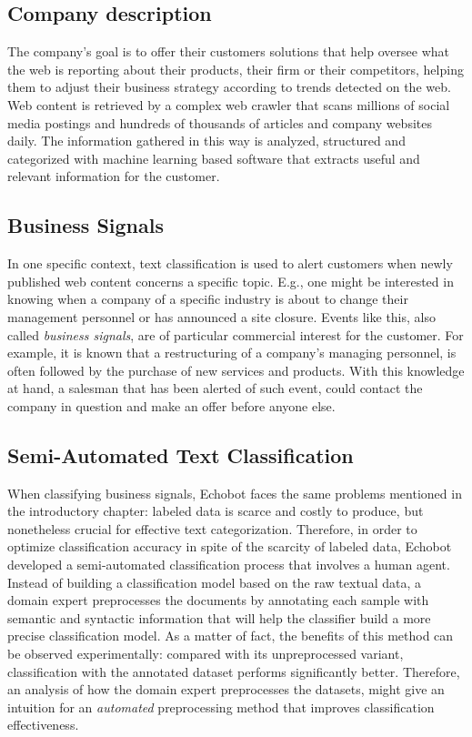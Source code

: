 \subsection{Company description}
The company's goal is to offer their customers solutions that
help oversee what the web is reporting about their products, their firm or
their competitors, helping them to adjust their business strategy according
to trends detected on the web. Web content is retrieved by a complex web crawler
that scans millions of social media postings and hundreds of thousands
of articles and company websites daily. The information gathered in this way is
analyzed, structured and categorized with machine learning based software that
extracts useful and relevant information for the customer.

\subsection{Business Signals}

In one specific context, text classification is used to alert customers when
newly published web content concerns a specific topic. E.g., one might
be interested in knowing when a company of a specific industry is about to change
their management personnel or has announced a site closure.
Events like this, also called \textit{business signals}, are of particular
commercial interest for the customer. For example, it is known that a
restructuring of a company's managing personnel, is often followed by the purchase of new
services and products. With this knowledge at hand, a salesman that has been
alerted of such event, could contact the company in question and make an offer
before anyone else.

\subsection{Semi-Automated Text Classification}

When classifying business signals, Echobot faces the same problems
mentioned in the introductory chapter: labeled data is scarce and costly to produce,
but nonetheless crucial for effective text categorization. Therefore, in order
to optimize classification accuracy in spite of the scarcity of labeled data, Echobot developed
a semi-automated classification process that involves a human agent. Instead of
building a classification model based on the raw textual data, a domain expert
preprocesses the documents by annotating each sample with semantic and
syntactic information that will help the classifier build a more precise
classification model. As a matter of fact, the benefits of this method can be
observed experimentally: compared with its unpreprocessed variant, classification with
the annotated dataset performs significantly better. Therefore, an analysis of
how the domain expert preprocesses the datasets, might give an intuition for
an \emph{automated} preprocessing method that improves classification
effectiveness.

